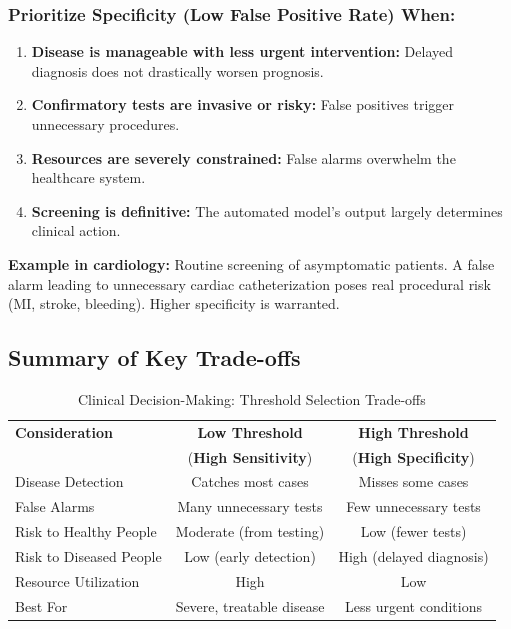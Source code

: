 \documentclass[11pt]{article}
\begin{document}
\subsubsection{Prioritize Specificity (Low False Positive Rate) When:}

\begin{enumerate}
    \item \textbf{Disease is manageable with less urgent intervention:} Delayed diagnosis does not drastically worsen prognosis.
    \item \textbf{Confirmatory tests are invasive or risky:} False positives trigger unnecessary procedures.
    \item \textbf{Resources are severely constrained:} False alarms overwhelm the healthcare system.
    \item \textbf{Screening is definitive:} The automated model's output largely determines clinical action.
\end{enumerate}

\textbf{Example in cardiology:} Routine screening of asymptomatic patients. A false alarm leading to unnecessary cardiac catheterization poses real procedural risk (MI, stroke, bleeding). Higher specificity is warranted.

\subsection{Summary of Key Trade-offs}

\begin{table}[H]
    \centering
    \caption{Clinical Decision-Making: Threshold Selection Trade-offs}
    \begin{tabular}{lcc}
        \toprule
        \textbf{Consideration} & \textbf{Low Threshold} & \textbf{High Threshold} \\
        & (\textbf{High Sensitivity}) & (\textbf{High Specificity}) \\
        \midrule
        Disease Detection & Catches most cases & Misses some cases \\
        False Alarms & Many unnecessary tests & Few unnecessary tests \\
        Risk to Healthy People & Moderate (from testing) & Low (fewer tests) \\
        Risk to Diseased People & Low (early detection) & High (delayed diagnosis) \\
        Resource Utilization & High & Low \\
        Best For & Severe, treatable disease & Less urgent conditions \\
        \bottomrule
    \end{tabular}
    \label{tab:threshold_tradeoffs}
\end{table}
\end{document}
